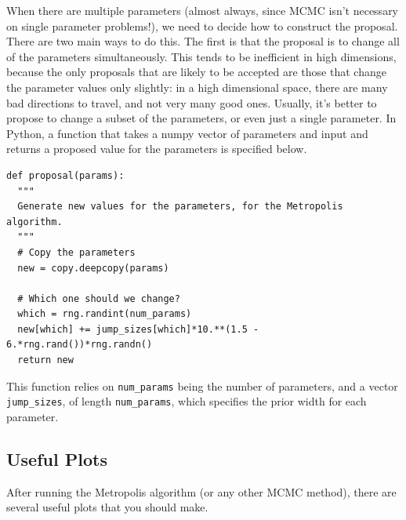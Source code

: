 When there are multiple parameters (almost always, since MCMC isn't necessary
on single parameter problems!), we need to decide how to construct the proposal.
There are two main ways to do this. The first is that the proposal is to
change all of the parameters simultaneously. This tends to be inefficient in
high dimensions, because the only proposals that are likely to be accepted
are those that change the parameter values only slightly: in a high dimensional
space, there are many bad directions to travel, and not very many good ones.
Usually, it's better to propose to change a subset of the parameters, or even
just a single parameter. In Python, a function that takes a numpy vector of
parameters and input and returns a proposed value for the parameters is
specified below.

\begin{verbatim}
def proposal(params):
  """
  Generate new values for the parameters, for the Metropolis algorithm.
  """
  # Copy the parameters
  new = copy.deepcopy(params)

  # Which one should we change?
  which = rng.randint(num_params)
  new[which] += jump_sizes[which]*10.**(1.5 - 6.*rng.rand())*rng.randn()
  return new
\end{verbatim}
This function relies on {\tt num\_params} being the number of parameters,
and a vector {\tt jump\_sizes}, of length {\tt num\_params}, which specifies
the prior width for each parameter.


\subsection{Useful Plots}
After running the Metropolis algorithm (or any other MCMC method), there are
several useful plots that you should make.

